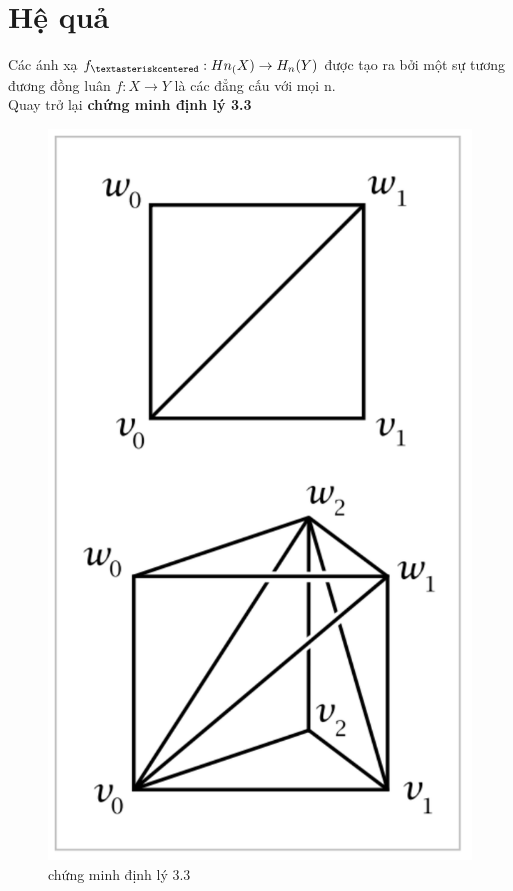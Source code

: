 \section{Hệ quả}
\indent Các ánh xạ \(f_{\textasteriskcentered} : Hn_(X) \rightarrow H_n(Y)\) được tạo ra bởi một sự tương đương đồng luân \(f : X \rightarrow Y\) là các đẳng cấu với mọi n. \\
\indent Quay trở lại \textbf{chứng minh định lý 3.3} \\
\begin{figure} 
\centering
\includegraphics[scale=0.3]{figures/chap3_1}
\caption[chứng minh định lý 3.3]{chứng minh định lý 3.3
\label{fig:chap3_1}}
\end{figure}
